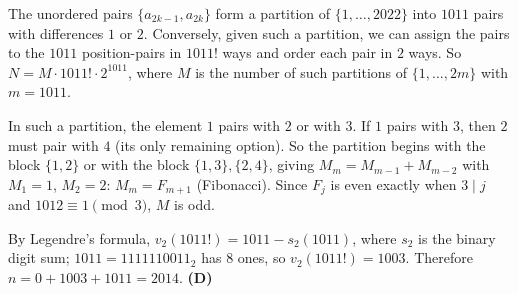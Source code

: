 The unordered pairs $\{a_{2k-1},a_{2k}\}$ form a partition of $\{1,\dots,2022\}$ into $1011$ pairs with differences $1$ or $2$. Conversely, given such a partition, we can assign the pairs to the $1011$ position-pairs in $1011!$ ways and order each pair in $2$ ways. So $N=M\cdot1011!\cdot2^{1011}$, where $M$ is the number of such partitions of $\{1,\dots,2m\}$ with $m=1011$.

In such a partition, the element $1$ pairs with $2$ or with $3$. If $1$ pairs with $3$, then $2$ must pair with $4$ (its only remaining option). So the partition begins with the block $\{1,2\}$ or with the block $\{1,3\},\{2,4\}$, giving $M_m=M_{m-1}+M_{m-2}$ with $M_1=1$, $M_2=2$: $M_m=F_{m+1}$ (Fibonacci). Since $F_j$ is even exactly when $3\mid j$ and $1012\equiv1\pmod3$, $M$ is odd.

By Legendre's formula, $v_2(1011!)=1011-s_2(1011)$, where $s_2$ is the binary digit sum; $1011=1111110011_2$ has $8$ ones, so $v_2(1011!)=1003$. Therefore $n=0+1003+1011=2014$. \textbf{(D)}
